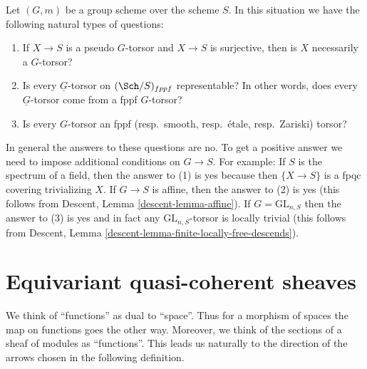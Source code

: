 \begin{remark}
\label{remark-fun-with-torsors}
Let $(G, m)$ be a group scheme over the scheme $S$.
In this situation we have the following natural types of questions:
\begin{enumerate}
\item If $X \to S$ is a pseudo $G$-torsor and $X \to S$ is surjective,
then is $X$ necessarily a $G$-torsor?
\item Is every $\underline{G}$-torsor on $(\Sch/S)_{fppf}$
representable? In other words, does every $\underline{G}$-torsor
come from a fppf $G$-torsor?
\item Is every $G$-torsor an
fppf (resp.\ smooth, resp.\ \'etale, resp.\ Zariski) torsor?
\end{enumerate}
In general the answers to these questions are no. To get a positive answer
we need to impose additional conditions on $G \to S$.
For example:
If $S$ is the spectrum of a field, then the answer to (1) is yes
because then $\{X \to S\}$ is a fpqc covering trivializing $X$.
If $G \to S$ is affine, then the answer to (2) is yes
(this follows from Descent, Lemma \ref{descent-lemma-affine}).
If $G = \text{GL}_{n, S}$ then the answer to (3) is yes
and in fact any $\text{GL}_{n, S}$-torsor is locally trivial
(this follows from
Descent, Lemma \ref{descent-lemma-finite-locally-free-descends}).
\end{remark}



\section{Equivariant quasi-coherent sheaves}
\label{section-equivariant}

\noindent
We think of ``functions'' as dual to ``space''. Thus for a morphism of spaces
the map on functions goes the other way. Moreover, we think of the
sections of a sheaf of modules as ``functions''. This leads us naturally
to the direction of the arrows chosen in the following definition.

